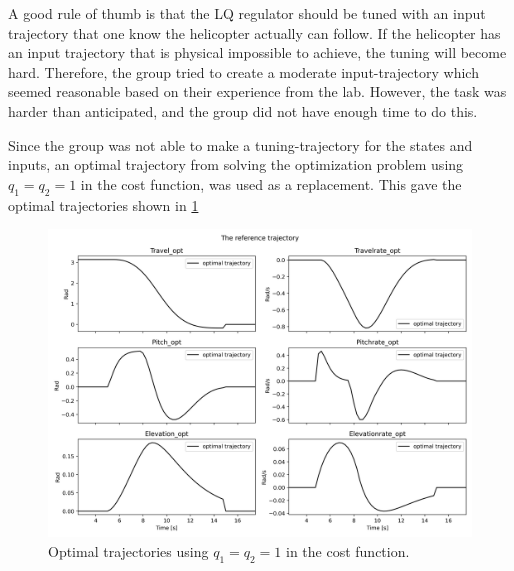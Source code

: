 \documentclass[../main.tex]{subfiles}
\begin{document}
A good rule of thumb is that the LQ regulator should be tuned with an input trajectory that one know the helicopter actually can follow. If the helicopter has an input trajectory that is physical impossible to achieve, the tuning will become hard. Therefore, the group tried to create a moderate input-trajectory which seemed reasonable based on their experience from the lab. However, the task was harder than anticipated, and the group did not have enough time to do this. 

Since the group was not able to make a tuning-trajectory for the states and inputs, an optimal trajectory from solving the optimization problem using $q_1 = q_2 = 1$ in the cost function, was used as a replacement. This gave the optimal trajectories shown in \cref{fig:lab4_opt_trajectory}

\begin{figure}[h]
	\centering
	\includegraphics[width=\linewidth]{figures/LAB4_reference_trajectory.png}
	\caption{Optimal trajectories using  $q_1 = q_2 = 1$ in the cost function.}
	\label{fig:lab4_opt_trajectory}
\end{figure}
\end{document}
